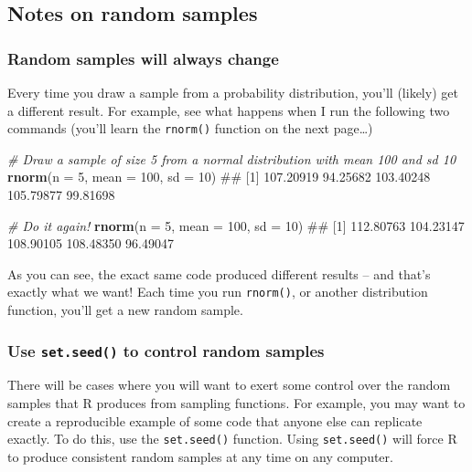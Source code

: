 \documentclass[]{book}
\newenvironment{Shaded}{\begin{snugshade}}{\end{snugshade}}
\newcommand{\KeywordTok}[1]{\textcolor[rgb]{0.13,0.29,0.53}{\textbf{#1}}}
\newcommand{\DataTypeTok}[1]{\textcolor[rgb]{0.13,0.29,0.53}{#1}}
\newcommand{\DecValTok}[1]{\textcolor[rgb]{0.00,0.00,0.81}{#1}}
\newcommand{\CommentTok}[1]{\textcolor[rgb]{0.56,0.35,0.01}{\textit{#1}}}
\newcommand{\NormalTok}[1]{#1}
\theoremstyle{definition}
\theoremstyle{definition}
\theoremstyle{remark}
\begin{document}
\subsection{Notes on random samples}\label{notes-on-random-samples}

\subsubsection{Random samples will always
change}\label{random-samples-will-always-change}

Every time you draw a sample from a probability distribution, you'll
(likely) get a different result. For example, see what happens when I
run the following two commands (you'll learn the \texttt{rnorm()}
function on the next page\ldots{})

\begin{Shaded}
\begin{Highlighting}[]
\CommentTok{# Draw a sample of size 5 from a normal distribution with mean 100 and sd 10}
\KeywordTok{rnorm}\NormalTok{(}\DataTypeTok{n =} \DecValTok{5}\NormalTok{, }\DataTypeTok{mean =} \DecValTok{100}\NormalTok{, }\DataTypeTok{sd =} \DecValTok{10}\NormalTok{)}
\NormalTok{## [1] 107.20919  94.25682 103.40248 105.79877  99.81698}

\CommentTok{# Do it again!}
\KeywordTok{rnorm}\NormalTok{(}\DataTypeTok{n =} \DecValTok{5}\NormalTok{, }\DataTypeTok{mean =} \DecValTok{100}\NormalTok{, }\DataTypeTok{sd =} \DecValTok{10}\NormalTok{)}
\NormalTok{## [1] 112.80763 104.23147 108.90105 108.48350  96.49047}
\end{Highlighting}
\end{Shaded}

As you can see, the exact same code produced different results -- and
that's exactly what we want! Each time you run \texttt{rnorm()}, or
another distribution function, you'll get a new random sample.

\subsubsection{\texorpdfstring{Use \texttt{set.seed()} to control random
samples}{Use set.seed() to control random samples}}\label{use-set.seed-to-control-random-samples}

There will be cases where you will want to exert some control over the
random samples that R produces from sampling functions. For example, you
may want to create a reproducible example of some code that anyone else
can replicate exactly. To do this, use the \texttt{set.seed()} function.
Using \texttt{set.seed()} will force R to produce consistent random
samples at any time on any computer.
\end{document}
